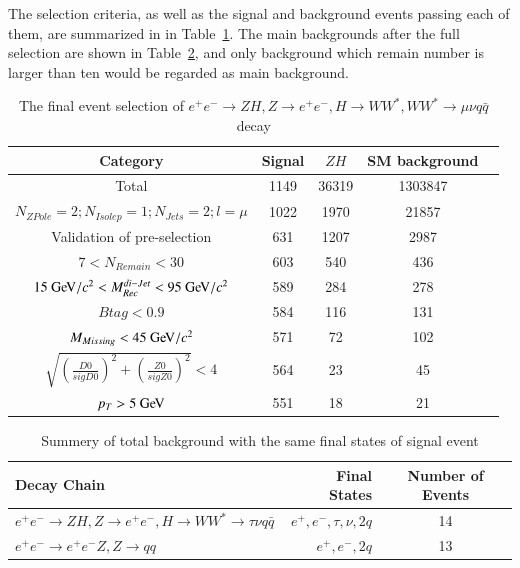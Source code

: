 \documentclass[11pt,a4paper]{cepcnote}
\begin{document}
The selection criteria, as well as the signal and background events
passing each of them, are summarized in in Table~\ref{tab:eeuvqqCutchain}.
The main backgrounds after the full selection are shown in Table~\ref{tab:uuuvqqbkg}, 
{\color{blue}and only background which remain number is larger than ten would be regarded as main background}.
\begin{table}[H]
  \begin{center}
    \begin{tabular}{ccccc}
      \hline \hline
      \multicolumn{1}{c}{Category} & \multicolumn{1}{c}{Signal}&\multicolumn{1}{c}{$ZH$} background&\multicolumn{1}{c}{SM background}\\ 
      \hline
      Total 	      	 									&   1149	& 36319	& 1303847\\
      $N_{ZPole}=2; N_{Isolep}=1; N_{Jets} =2; l = \mu$		&   1022	& 1970	& 21857\\
	  Validation of pre-selection					   		&   631 	& 1207	& 2987\\
	  $7 < N_{Remain} < 30$									&	603		& 540	& 436\\
	  $15\gev/c^2 < M_{Rec}^{di-Jet} < 95\gev/c^2 $			&	589		& 284	& 278\\
	  $Btag < 0.9$											&	584		& 116	& 131\\
	  $M_{Missing} < 45\gev/c^2$							&   571		& 72	& 102\\
	  $\sqrt{(\frac{D0}{sigD0})^2+(\frac{Z0}{sigZ0})^2} < 4$&	564  	& 23 	& 45\\
	  $p_T > 5\gev$											&	551		& 18	& 21	\\	
      \hline \hline
    \end{tabular}
  \caption[Monte Carlo purities in the single lepton sample]{%
    The final event selection of $e^+e^-\rightarrow ZH, Z\rightarrow e^+e^-, H\rightarrow WW^*, WW^*\rightarrow \mu\nu q\bar{q}$ decay}
  \label{tab:eeuvqqCutchain}
  \end{center}
\end{table}
\begin{table}[H]
\begin{center}
\begin{tabular}{lrc}
\hline\hline
Decay Chain	& Final States 	&	Number of Events	\\
\hline
$e^+e^-\rightarrow ZH, Z\rightarrow e^+e^-, H\rightarrow WW^*\rightarrow \tau\nu q\bar{q}$ & $e^+, e^-, \tau, \nu, 2q $	&	14\\
$e^+e^-\rightarrow e^+e^-Z, Z\rightarrow qq$ 					& $e^+, e^-, 2q$								&	13\\
\hline\hline
\end{tabular}
\caption{Summery of total background with the same final states of signal event}
\label{tab:uuuvqqbkg}
\end{center}
\end{table}
\end{document}
